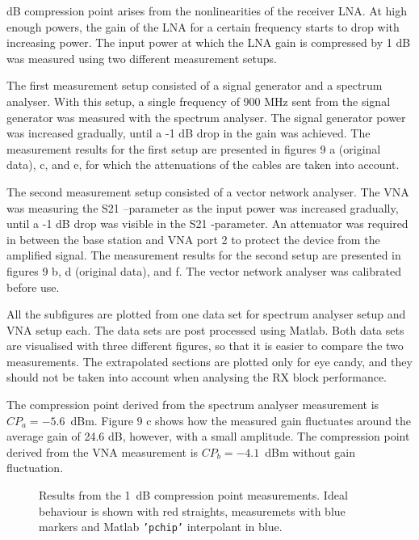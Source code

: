 \documentclass[a4paper, 12pt]{article}
\begin{document}
 dB compression point arises from the nonlinearities of the receiver LNA. At high enough powers, the gain of the LNA for a certain frequency starts to drop with increasing power. The input power at which the LNA gain is compressed by 1 dB was measured using two different measurement setups.

The first measurement setup consisted of a signal generator and a spectrum analyser. With this setup, a single frequency of 900 MHz sent from the signal generator was measured with the spectrum analyser. The signal generator power was increased gradually, until a -1 dB drop in the gain was achieved. The measurement results for the first setup are presented in figures 9 a (original data), c, and e, for which the attenuations of the cables are taken into account.

The second measurement setup consisted of a vector network analyser. The VNA was measuring the S21 –parameter as the input power was increased gradually, until a -1 dB drop was visible in the S21 -parameter. An attenuator was required in between the base station and VNA port 2 to protect the device from the amplified signal. The measurement results for the second setup are presented in figures 9 b, d (original data), and f. The vector network analyser was calibrated before use. 

All the subfigures are plotted from one data set for spectrum analyser setup and VNA setup each. The data sets are post processed using Matlab. Both data sets are visualised with three different figures, so that it is easier to compare the two measurements. The extrapolated sections are plotted only for eye candy, and they should not be taken into account when analysing the RX block performance.

The compression point derived from the spectrum analyser measurement is $CP_a = -5.6$~dBm. Figure 9 c shows how the measured gain fluctuates around the average gain of 24.6 dB, however, with a small amplitude. The compression point derived from the VNA measurement is $CP_b = -4.1$~dBm without gain fluctuation.


\begin{figure}
\centering
{}
\caption{Results from the 1~dB compression point measurements. Ideal behaviour is shown with red straights, 
	measuremets with blue markers and Matlab \texttt{'pchip'} interpolant in blue.}\label{f:1dB}
\end{figure}
\end{document}
